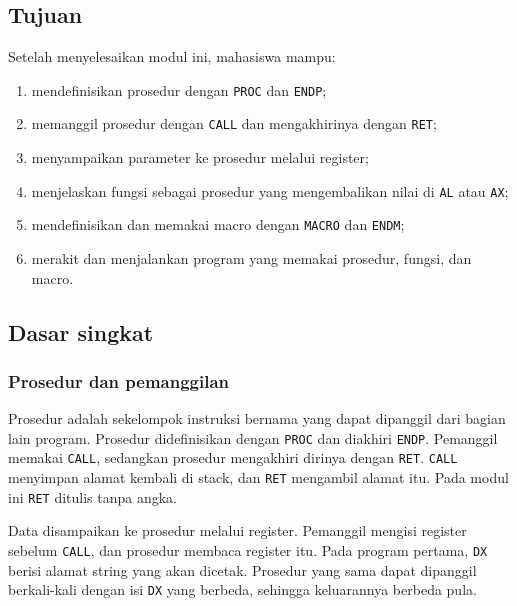 
\subsection{Tujuan}

\begin{tujuan}
Setelah menyelesaikan modul ini, mahasiswa mampu:
\begin{enumerate}
    \item mendefinisikan prosedur dengan \texttt{PROC} dan
          \texttt{ENDP};
    \item memanggil prosedur dengan \texttt{CALL} dan mengakhirinya
          dengan \texttt{RET};
    \item menyampaikan parameter ke prosedur melalui register;
    \item menjelaskan fungsi sebagai prosedur yang mengembalikan nilai
          di \texttt{AL} atau \texttt{AX};
    \item mendefinisikan dan memakai macro dengan \texttt{MACRO} dan
          \texttt{ENDM};
    \item merakit dan menjalankan program yang memakai prosedur,
          fungsi, dan macro.
\end{enumerate}
\end{tujuan}

\subsection{Dasar singkat}

\subsubsection*{Prosedur dan pemanggilan}

Prosedur adalah sekelompok instruksi bernama yang dapat dipanggil
dari bagian lain program. Prosedur didefinisikan dengan \texttt{PROC}
dan diakhiri \texttt{ENDP}. Pemanggil memakai \texttt{CALL}, sedangkan
prosedur mengakhiri dirinya dengan \texttt{RET}. \texttt{CALL}
menyimpan alamat kembali di stack, dan \texttt{RET} mengambil alamat
itu. Pada modul ini \texttt{RET} ditulis tanpa angka.

Data disampaikan ke prosedur melalui register. Pemanggil mengisi
register sebelum \texttt{CALL}, dan prosedur membaca register itu.
Pada program pertama, \texttt{DX} berisi alamat string yang akan
dicetak. Prosedur yang sama dapat dipanggil berkali-kali dengan isi
\texttt{DX} yang berbeda, sehingga keluarannya berbeda pula.

